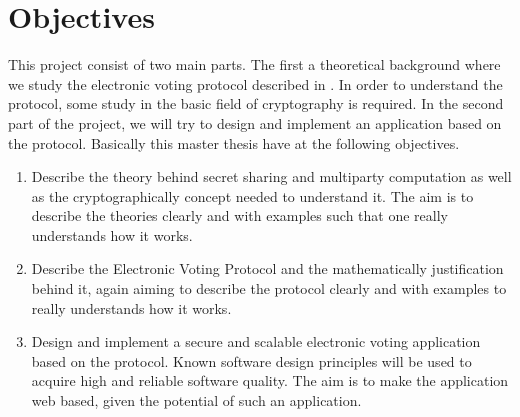\section{Objectives}
This project consist of two main parts. The first a theoretical background where we study the electronic voting protocol described in \cite{Schoenmakers1999}. In order to understand the protocol, some study in the basic field of cryptography is required. In the second part of the project, we will try to design and implement an application based on the protocol. Basically this master thesis have at the following objectives. 

\begin{enumerate}
    \item   Describe the theory behind secret sharing and multiparty computation as well as the cryptographically concept needed to understand it. The aim is to describe the theories clearly and with examples such that one really understands how it works. 
            
    \item   Describe the Electronic Voting Protocol \cite{Schoenmakers1999} and the mathematically justification behind it, again aiming to describe the protocol clearly and with examples to really understands how it works. 
    
    \item   Design and implement a secure and scalable electronic voting application based on the protocol. Known software design principles will be used to acquire high and reliable software quality.
    The aim is to make the application web based, given the potential of such an application.
\end{enumerate}


